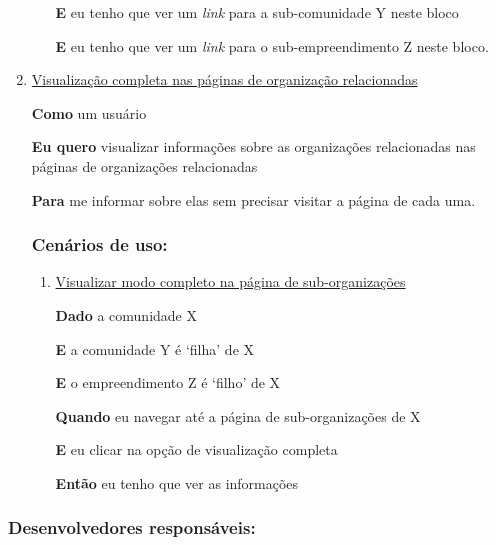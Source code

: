 \begin{enumerate}
\begin{enumerate}
\textbf{E} eu tenho que ver um \textit{link} para a sub-comunidade Y neste
bloco

\textbf{E} eu tenho que ver um \textit{link} para o sub-empreendimento Z neste
bloco.

\end{enumerate}

\item \underline{Visualização completa nas páginas de organização relacionadas}

\textbf{Como} um usuário

\textbf{Eu quero} visualizar informações sobre as organizações relacionadas nas
páginas de organizações relacionadas

\textbf{Para} me informar sobre elas sem precisar visitar a página de cada uma.

\subsubsection*{Cenários de uso:}

\begin{enumerate}

\item \underline{Visualizar modo completo na página de sub-organizações}

\textbf{Dado} a comunidade X

\textbf{E} a comunidade Y é `filha' de X

\textbf{E} o empreendimento Z é `filho' de X

\textbf{Quando} eu navegar até a página de sub-organizações de X

\textbf{E} eu clicar na opção de visualização completa

\textbf{Então} eu tenho que ver as informações

\end{enumerate}

\end{enumerate}


\subsubsection*{Desenvolvedores responsáveis:}


